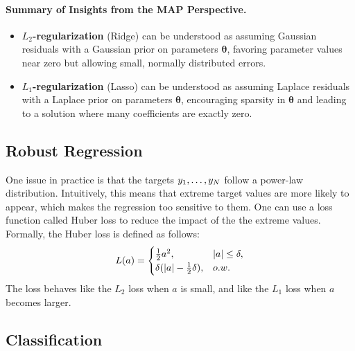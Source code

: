 {    \paragraph{Summary of Insights from the MAP Perspective.}
    
    \begin{itemize}
        \item \textbf{\( L_2 \)-regularization} (Ridge) can be understood as assuming Gaussian residuals with a Gaussian prior on parameters \( \bm{\theta} \), favoring parameter values near zero but allowing small, normally distributed errors.
        \item \textbf{\( L_1 \)-regularization} (Lasso) can be understood as assuming Laplace residuals with a Laplace prior on parameters \( \bm{\theta} \), encouraging sparsity in \( \bm{\theta} \) and leading to a solution where many coefficients are exactly zero.
    \end{itemize}


    \subsection{Robust Regression}
        One issue in practice is that the targets $y_1, \ldots, y_{N}$ follow a power-law distribution. 
        Intuitively, this means that extreme target values are more likely to appear, which makes the regression too sensitive to them.
        One can use a loss function called Huber loss to reduce the impact of the the extreme values.
        Formally, the Huber loss is defined as follows:
            \begin{equation}
                L(a) = \begin{cases}
                            \frac{1}{2} a^2 , &| a | \le \delta, \\
                            \delta (| a | - \frac{1}{2}\delta) , & o.w.
                       \end{cases}
            \end{equation}
        The loss behaves like the $L_2$ loss when $a$ is small, and  like the $L_1$ loss when $a$ becomes larger. 
        

        
    
\subsection{Classification}
}
